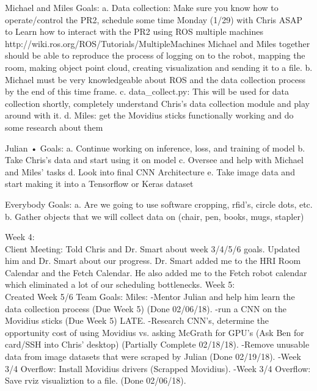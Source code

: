 \documentclass[draftclsnofoot, onecolumn, 10pt, compsoc]{IEEEtran}
\begin{document}
Michael and Miles Goals:
		a. Data collection: Make sure you know how to operate/control the PR2, schedule some time Monday (1/29) with Chris ASAP to Learn how to interact with the PR2 using ROS multiple machines http://wiki.ros.org/ROS/Tutorials/MultipleMachines Michael and Miles together should be able to reproduce the process of logging on to the robot, mapping the room, making object point cloud, creating visualization and sending it to a file.
		b. Michael must be very knowledgeable about ROS and the data collection process by the end of this time frame. 
		c. data\_collect.py: This will be used for data collection shortly, completely understand Chris's data collection module and play around with it.
		d. Miles: get the Movidius sticks functionally working and do some research about them
	
Julian
	• Goals:
		a. Continue working on inference, loss, and training of model
		b. Take Chris's data and start using it on model
		c. Oversee and help with Michael and Miles' tasks
		d. Look into final CNN Architecture
		e. Take image data and start making it into a Tensorflow or Keras dataset

Everybody
	Goals:
		a. Are we going to use software cropping, rfid's, circle dots, etc.
		b. Gather objects that we will collect data on (chair, pen, books, mugs, stapler)

Week 4:
\\ \indent Client Meeting:
Told Chris and Dr. Smart about week 3/4/5/6 goals. Updated him and Dr. Smart about our progress.
Dr. Smart added me to  the HRI Room Calendar and the Fetch Calendar. He also added me to the Fetch robot calendar
which eliminated a lot of our scheduling bottlenecks.
Week 5:
\\ \indent Created Week 5/6 Team Goals:
	Miles:
		-Mentor Julian and help him learn the data collection process (Due Week 5) (Done 02/06/18).
		-run a CNN on the Movidius sticks (Due Week 5) LATE.
		-Research CNN's,  determine the opportunity cost of using Movidius vs. asking McGrath for GPU's (Ask Ben for card/SSH into Chris' desktop) (Partially Complete 02/18/18).
		-Remove unusable data from image datasets that were scraped by Julian  (Done 02/19/18).
		-Week 3/4 Overflow: Install Movidius drivers  (Scrapped Movidius).
		-Week 3/4 Overflow: Save rviz visualiztion to a file.  (Done 02/06/18).
		
\end{document}

